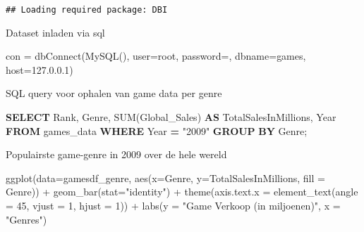 \documentclass[
]{article}
\newenvironment{Shaded}{\begin{snugshade}}{\end{snugshade}}
\newcommand{\AttributeTok}[1]{\textcolor[rgb]{0.77,0.63,0.00}{#1}}
\newcommand{\DecValTok}[1]{\textcolor[rgb]{0.00,0.00,0.81}{#1}}
\newcommand{\FunctionTok}[1]{\textcolor[rgb]{0.00,0.00,0.00}{#1}}
\newcommand{\KeywordTok}[1]{\textcolor[rgb]{0.13,0.29,0.53}{\textbf{#1}}}
\newcommand{\NormalTok}[1]{#1}
\newcommand{\OperatorTok}[1]{\textcolor[rgb]{0.81,0.36,0.00}{\textbf{#1}}}
\newcommand{\OtherTok}[1]{\textcolor[rgb]{0.56,0.35,0.01}{#1}}
\newcommand{\SpecialCharTok}[1]{\textcolor[rgb]{0.00,0.00,0.00}{#1}}
\newcommand{\StringTok}[1]{\textcolor[rgb]{0.31,0.60,0.02}{#1}}
\begin{document}
\begin{verbatim}
## Loading required package: DBI
\end{verbatim}

Dataset inladen via sql

\begin{Shaded}
\begin{Highlighting}[]
\NormalTok{con }\OtherTok{=} \FunctionTok{dbConnect}\NormalTok{(}\FunctionTok{MySQL}\NormalTok{(), }
                \AttributeTok{user=}\StringTok{\textquotesingle{}root\textquotesingle{}}\NormalTok{,}
                \AttributeTok{password=}\StringTok{\textquotesingle{}\textquotesingle{}}\NormalTok{,}
                \AttributeTok{dbname=}\StringTok{\textquotesingle{}games\textquotesingle{}}\NormalTok{,}
                \AttributeTok{host=}\StringTok{\textquotesingle{}127.0.0.1\textquotesingle{}}\NormalTok{)}
\end{Highlighting}
\end{Shaded}

SQL query voor ophalen van game data per genre

\begin{Shaded}
\begin{Highlighting}[]
\KeywordTok{SELECT}\NormalTok{ \textasciigrave{}Rank\textasciigrave{}, \textasciigrave{}Genre\textasciigrave{}, }\FunctionTok{SUM}\NormalTok{(\textasciigrave{}Global\_Sales\textasciigrave{}) }\KeywordTok{AS}\NormalTok{ \textasciigrave{}TotalSalesInMillions\textasciigrave{}, \textasciigrave{}Year\textasciigrave{} }
  \KeywordTok{FROM}\NormalTok{ \textasciigrave{}games\_data\textasciigrave{} }
    \KeywordTok{WHERE}\NormalTok{ \textasciigrave{}Year\textasciigrave{} }\OperatorTok{=} \OtherTok{"2009"}
      \KeywordTok{GROUP} \KeywordTok{BY}\NormalTok{ \textasciigrave{}Genre\textasciigrave{};}
\end{Highlighting}
\end{Shaded}

Populairste game-genre in 2009 over de hele wereld

\begin{Shaded}
\begin{Highlighting}[]
\FunctionTok{ggplot}\NormalTok{(}\AttributeTok{data=}\NormalTok{gamesdf\_genre,}
  \FunctionTok{aes}\NormalTok{(}\AttributeTok{x=}\NormalTok{Genre, }\AttributeTok{y=}\NormalTok{TotalSalesInMillions, }\AttributeTok{fill =}\NormalTok{ Genre)) }\SpecialCharTok{+}
  \FunctionTok{geom\_bar}\NormalTok{(}\AttributeTok{stat=}\StringTok{"identity"}\NormalTok{) }\SpecialCharTok{+}
    \FunctionTok{theme}\NormalTok{(}\AttributeTok{axis.text.x =} \FunctionTok{element\_text}\NormalTok{(}\AttributeTok{angle =} \DecValTok{45}\NormalTok{, }\AttributeTok{vjust =} \DecValTok{1}\NormalTok{, }\AttributeTok{hjust =} \DecValTok{1}\NormalTok{)) }\SpecialCharTok{+}
       \FunctionTok{labs}\NormalTok{(}\AttributeTok{y =} \StringTok{"Game Verkoop (in miljoenen)"}\NormalTok{, }\AttributeTok{x =} \StringTok{"Genres"}\NormalTok{) }
\end{Highlighting}
\end{Shaded}
\end{document}
